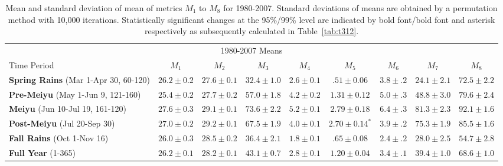 \documentclass{ametsoc}
\begin{document}
\begin{landscape}
\begin{table}[p]
\footnotesize
\centering

\caption{Mean and standard deviation of mean of metrics $M_1$ to $M_8$ for 1980-2007. Standard deviations of means are obtained by a permutation method with 10,000 iterations. Statistically significant changes at the 95\%/99\% level are indicated by bold font/bold font and asterisk respectively as subsequently calculated in Table~\ref{tab:t312}.}

\begin{tabular}{ l c c c c c c c c}
	 \multicolumn{9}{c}{1980-2007 Means} \\
	 Time Period 								& $M_1$ 		& $M_2$ 					& $M_3$ 		& $M_4$ 		& $M_5$ 						& $M_6$ 		& $M_7$ 		& $M_8$ \\
	\hline
	\textbf{Spring Rains} (Mar 1-Apr 30, 60-120)  	& $26.2 \pm 0.2$ 	&  $\boldsymbol{27.6 \pm 0.1}$	&  $32.4 \pm 1.0$ 	&$2.6 \pm 0.1$ 	& $.51 \pm 0.06$ 					& $3.8 \pm .2$ 	& $24.1 \pm 2.1$ 	& $72.5 \pm 2.2$  \\
	\textbf{Pre-Meiyu} (May 1-Jun 9, 121-160)  	& $25.4 \pm 0.2$ 	&  $27.7 \pm 0.2$				&  $57.0 \pm 1.8$ 	&$4.2 \pm 0.2$	& $1.31 \pm 0.12$ 				& $5.0 \pm .3$ 	& $48.8 \pm 3.0$ 	& $79.6 \pm 2.4$ \\
	\textbf{Meiyu} (Jun 10-Jul 19, 161-120)		& $27.6 \pm 0.3$ 	&  $29.1 \pm 0.1$				&  $73.6 \pm 2.2$ 	&$5.2 \pm 0.1$ 	& $2.79 \pm 0.18$					& $6.4 \pm .3$ 	& $81.3 \pm 2.3$ 	& $92.1 \pm 1.6$ \\
	\textbf{Post-Meiyu} (Jul 20-Sep 30) 			& $27.0 \pm 0.2 $	&  $29.2 \pm 0.1$ 				&  $67.5 \pm 1.9$ 	&$4.0 \pm 0.1$ 	& $\boldsymbol{2.70 \pm 0.14^*}$	& $3.9 \pm .2$ 	& $75.3 \pm 1.9$ 	& $85.5 \pm 1.6$ \\
	\textbf{Fall Rains} (Oct 1-Nov 16) 				& $26.0 \pm 0.3 $ 	&  $28.5 \pm 0.2$				&  $36.4 \pm 2.1$ 	&$1.8 \pm 0.1$	& $.65 \pm 0.08$ 					& $2.4 \pm .2$ 	& $28.0 \pm 2.5$ 	& $54.7 \pm 2.8$ \\
	\textbf{Full Year} (1-365)					& $26.2 \pm 0.1$ 	&  $28.2 \pm 0.1$ 				&  $43.1 \pm 0.7$ 	&$2.8 \pm 0.1$ 	& $\boldsymbol{1.20 \pm 0.04}$		& $3.4 \pm .1$ 	& $39.4 \pm 1.0$ 	& $68.6 \pm 1.0$ \\
\end{tabular}
\label{tab:t310}
\end{table}
\end{landscape}
\end{document}
